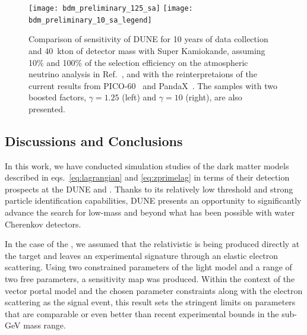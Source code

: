 \begin{figure}[!htb]
\centering
\texttt{[image: bdm\_preliminary\_125\_sa]}\hspace{0.05\textwidth}
\texttt{[image: bdm\_preliminary\_10\_sa\_legend]}
\caption[Sensitivity of DUNE (10 yr) to \superk]{Comparison of sensitivity of DUNE for 10 years of data collection and 40~kton of detector mass with Super Kamiokande, assuming 10\% and 100\% of the selection efficiency on the atmospheric neutrino analysis in Ref.~\cite{Fechner:2009aa}, and with the reinterpretaions of the current results from PICO-60~\cite{Amole:2019fdf} and PandaX~\cite{Xia:2018qgs}.  The samples with two boosted factors, $\gamma = 1.25$ (left) and $\gamma = 10$ (right), are also presented. \label{fig:bdm_sensitivity_comparison}}
\end{figure}

\subsection{Discussions and Conclusions}

In this work, we have conducted simulation studies of the dark matter models described in eqs.~\eqref{eq:lagrangian} and \eqref{eq:zprimelag} in terms of their detection prospects at the DUNE  and . 
Thanks to its relatively low threshold and strong particle identification capabilities, DUNE presents an opportunity to significantly advance the search for low-mass  and  beyond what has been possible with water Cherenkov detectors.

In the case of the , we assumed that the relativistic  is being produced directly at the target and leaves an experimental signature through an elastic electron scattering. Using two constrained parameters of the light  model and a range of two free parameters, a sensitivity map was produced. Within the context of the vector portal  model and the chosen parameter constraints along with the electron scattering as the signal event, this result sets the stringent limits on  parameters that are comparable or even better than recent experimental bounds in the sub-GeV mass range.

